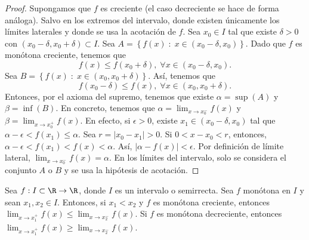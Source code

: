 \begin{proof}
	Supongamos que $\displaystyle f $ es creciente (el caso decreciente se hace de forma análoga). Salvo en los extremos del intervalo, donde existen únicamente los límites laterales y donde se usa la acotación de $\displaystyle f $. Sea $\displaystyle x_{0} \in I $ tal que existe $\displaystyle \delta > 0 $ con $\displaystyle \left(x_{0}-\delta, x_{0}+\delta \right)\subset I $. Sea $\displaystyle A = \left\{ f\left(x\right) \; : \; x \in \left(x_{0}-\delta, x_{0} \right)\right\}  $. Dado que $\displaystyle f $ es monótona creciente, tenemos que
	\[f\left(x\right) \leq f\left(x_{0} + \delta \right), \; \forall x \in \left(x_{0} - \delta, x_{0}\right) .\]
	Sea $\displaystyle B = \left\{ f\left(x\right) \; : \; x \in \left(x_{0}, x_{0}+\delta \right)\right\}  $. Así, tenemos que 
	\[ f\left(x_{0}-\delta \right)\leq f\left(x\right), \; \forall x \in \left(x_{0}, x_{0}+\delta\right) .\]
Entonces, por el axioma del supremo, tenemos que existe $\displaystyle \alpha = \sup\left(A\right) $ y $\displaystyle \beta = \inf\left(B\right) $. En concreto, tenemos que $\displaystyle \alpha = \lim_{x \to x_{0}^{-}}f\left(x\right) $ y $\displaystyle \beta = \lim_{x \to x_{0}^{+}}f\left(x\right) $. En efecto, si $\displaystyle \epsilon > 0 $, existe $\displaystyle x_{1} \in \left(x_{0}-\delta, x_{0} \right) $ tal que $\displaystyle \alpha - \epsilon < f\left(x_{1}\right) \leq \alpha  $. Sea $\displaystyle r = \left|x_{0}-x_{1}\right| > 0 $. Si $\displaystyle 0 < x - x_{0} < r $, entonces, $\displaystyle \alpha - \epsilon < f\left(x_{1}\right) < f\left(x\right) < \alpha  $. Así, $\displaystyle \left|\alpha - f\left(x\right)\right| < \epsilon  $. Por definición de límite lateral, $\displaystyle \lim_{x \to x_{0}^{-}}f\left(x\right) = \alpha  $.
En los límites del intervalo, solo se considera el conjunto $\displaystyle A $  o $\displaystyle B $ y se usa la hipótesis de acotación.
\end{proof}
\begin{ftheorem}[]
\normalfont Sea $\displaystyle f : I \subset \R \to \R $, donde $\displaystyle I $ es un intervalo o semirrecta. Sea $\displaystyle f $ monótona en $\displaystyle I $ y sean $\displaystyle x_{1}, x_{2} \in I $. Entonces, si $\displaystyle x_{1} < x_{2} $ y $\displaystyle f $ es monótona creciente, entonces $\displaystyle \lim_{x \to x_{1}^{+}}f\left(x\right) \leq \lim_{x \to x_{2}^{-}}f\left(x\right) $. Si $\displaystyle f $ es monótona decreciente, entonces $\displaystyle \lim_{x \to x_{1}^{+}}f\left(x\right) \geq \lim_{x \to x_{2}^{-}}f\left(x\right) $.
\end{ftheorem}
